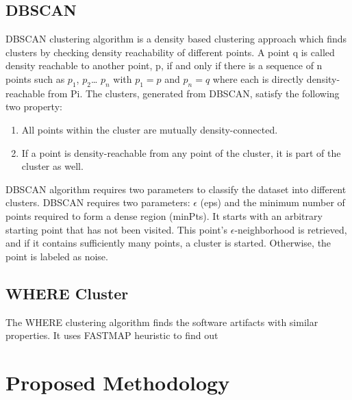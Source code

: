 \documentclass[12pt]{report}
\begin{document}
\subsection{DBSCAN}
DBSCAN clustering algorithm is a density based clustering approach which finds clusters by checking density reachability of different points. A point q is called density reachable to another point, p, if and only if there is a sequence of n points such as $p_{1}$, $p_{2}$… $p_{n}$ with $p_{1}=p$ and $p_{n}=q$ where each is directly density-reachable from Pi. The clusters, generated from DBSCAN, satisfy the following two property:
\begin{enumerate}
	\item {All points within the cluster are mutually density-connected.}
	\item {If a point is density-reachable from any point of the cluster, it is part of the cluster as well.}
\end{enumerate}
	
DBSCAN algorithm requires two parameters to classify the dataset into different clusters. DBSCAN requires two parameters: $\epsilon$ (eps) and the minimum number of points required to form a dense region (minPts). It starts with an arbitrary starting point that has not been visited. This point's $\epsilon$-neighborhood is retrieved, and if it contains sufficiently many points, a cluster is started. Otherwise, the point is labeled as noise. 


\subsection{WHERE Cluster}

The WHERE clustering algorithm finds the software artifacts with similar properties. It uses FASTMAP heuristic to find out 

\section{Proposed Methodology}
\end{document}
